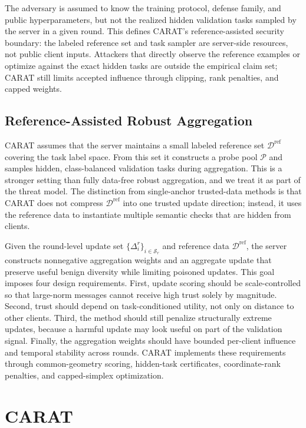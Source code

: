 \documentclass{article}
\begin{document}
The adversary is assumed to know the training protocol, defense family, and public hyperparameters, but not the realized hidden validation tasks sampled by the server in a given round. This defines CARAT's reference-assisted security boundary: the labeled reference set and task sampler are server-side resources, not public client inputs. Attackers that directly observe the reference examples or optimize against the exact hidden tasks are outside the empirical claim set; CARAT still limits accepted influence through clipping, rank penalties, and capped weights.

\subsection{Reference-Assisted Robust Aggregation}

CARAT assumes that the server maintains a small labeled reference set $\mathcal{D}^{\mathrm{ref}}$ covering the task label space. From this set it constructs a probe pool $\mathcal{P}$ and samples hidden, class-balanced validation tasks during aggregation. This is a stronger setting than fully data-free robust aggregation, and we treat it as part of the threat model. The distinction from single-anchor trusted-data methods is that CARAT does not compress $\mathcal{D}^{\mathrm{ref}}$ into one trusted update direction; instead, it uses the reference data to instantiate multiple semantic checks that are hidden from clients.

Given the round-level update set $\{\Delta_i^r\}_{i\in\mathcal{S}_r}$ and reference data $\mathcal{D}^{\mathrm{ref}}$, the server constructs nonnegative aggregation weights and an aggregate update that preserve useful benign diversity while limiting poisoned updates. This goal imposes four design requirements. First, update scoring should be scale-controlled so that large-norm messages cannot receive high trust solely by magnitude. Second, trust should depend on task-conditioned utility, not only on distance to other clients. Third, the method should still penalize structurally extreme updates, because a harmful update may look useful on part of the validation signal. Finally, the aggregation weights should have bounded per-client influence and temporal stability across rounds. CARAT implements these requirements through common-geometry scoring, hidden-task certificates, coordinate-rank penalties, and capped-simplex optimization.

\section{CARAT}
\label{sec:method}
\end{document}
